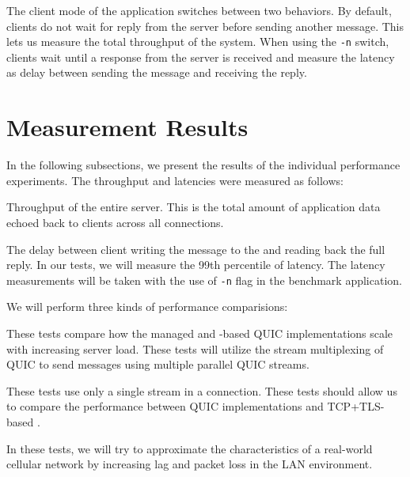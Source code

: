 The client mode of the application switches between two behaviors. By default, clients do not wait
for reply from the server before sending another message. This lets us measure the total throughput
of the system. When using the \texttt{-n} switch, clients wait until a response from the server is
received and measure the latency as delay between sending the message and receiving the reply.

\section{Measurement Results}\label{sec:04-perf-results}

In the following subsections, we present the results of the individual performance experiments. The
throughput and latencies were measured as follows:

\begin{itemize}

   Throughput of the entire server. This is the total amount of application data
  echoed back to clients across all connections.

   The delay between client writing the message to the \Stream{} and reading back the
full reply. In our tests, we will measure the 99th percentile of latency. The latency measurements
will be taken with the use of \texttt{-n} flag in the benchmark application.

\end{itemize}

We will perform three kinds of performance comparisions:

\begin{itemize}

         These tests compare how the managed and
        \libmsquic{}-based QUIC implementations scale with increasing server load. These tests will
        utilize the stream multiplexing of QUIC to send messages using multiple parallel QUIC
        streams.

         These tests use only a single stream in a connection.
        These tests should allow us to compare the performance between QUIC implementations and
        TCP+TLS-based \SslStream{}.

         In these tests, we will try to approximate
        the characteristics of a real-world cellular network by increasing lag and packet loss in
        the LAN environment.

\end{itemize}

